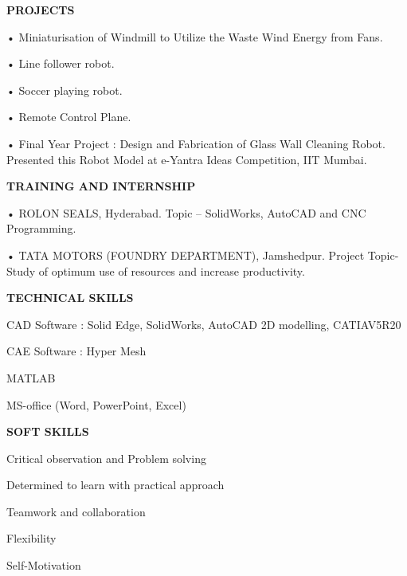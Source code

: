 \documentclass{article}
\begin{document}

\textbf{\LARGE PROJECTS}
\begin{enumerate}
	{\large \item •	Miniaturisation of Windmill to Utilize the Waste Wind Energy from Fans.}
	{\large \item • Line follower robot.}
	{\large \item •	Soccer playing robot.}
	{\large \item •	Remote Control Plane.}
	{\large \item •	Final Year Project : Design and Fabrication of Glass Wall Cleaning Robot.\\
		Presented this Robot Model at e-Yantra Ideas Competition, IIT Mumbai.}
\end{enumerate}\vspace{15px}


\textbf{\LARGE TRAINING AND INTERNSHIP}
\begin{itemize}
	{\large \item •	ROLON SEALS, Hyderabad. Topic – SolidWorks, AutoCAD and CNC Programming.}
	{\large \item •	TATA MOTORS (FOUNDRY DEPARTMENT), Jamshedpur. Project Topic- Study of optimum use of resources and increase productivity.}
\end{itemize}\vspace{15px}


\textbf{\LARGE TECHNICAL SKILLS}
\begin{itemize}
	{\large \item CAD Software : Solid Edge, SolidWorks, AutoCAD 2D modelling, CATIAV5R20 }
	{\large \item CAE Software : Hyper Mesh}
	{\large \item MATLAB }
	{\large \item MS-office (Word, PowerPoint, Excel)}
\end{itemize}\vspace{15px}


\textbf{\LARGE SOFT SKILLS}
\begin{enumerate}
	{\large \item Critical observation and Problem solving }
	{\large \item Determined to learn with practical approach }
	{\large \item Teamwork and collaboration }
	{\large \item Flexibility }
	{\large \item Self-Motivation }
\end{enumerate}\vspace{15px}
\end{document}
